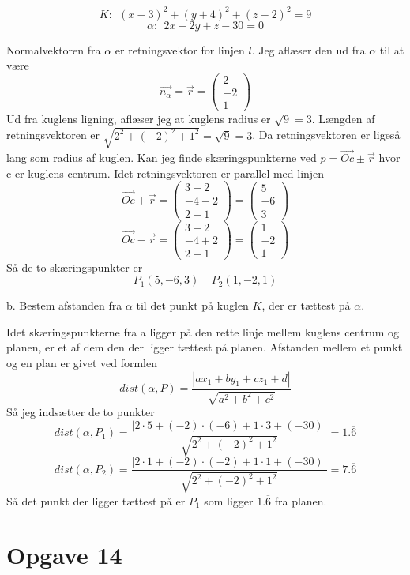 \documentclass[12pt]{article}
\begin{document}
$$K:~~(x-3)^2+(y+4)^2+(z-2)^2=9$$
$$\alpha:~~2x-2y+z-30=0$$

Normalvektoren fra $\alpha$ er retningsvektor for linjen $l$. Jeg aflæser den ud fra $\alpha$ til at være
$$\vec{n_\alpha} = \vec{r} = \begin{pmatrix} 2 \\ -2 \\ 1 \end{pmatrix}$$
Ud fra kuglens ligning, aflæser jeg at kuglens radius er $\sqrt{9} = 3$. Længden af retningsvektoren er $\sqrt{2^2+(-2)^2+1^2} = \sqrt{9} = 3$. Da
retningsvektoren er ligeså lang som radius af kuglen. Kan jeg finde skæringspunkterne ved $p = \vec{Oc} \pm \vec{r}$ hvor c er kuglens centrum.
Idet retningsvektoren er parallel med linjen
$$\vec{Oc} + \vec{r} = \begin{pmatrix} 3+2 \\ -4-2 \\ 2+1 \end{pmatrix} = \begin{pmatrix} 5 \\ -6 \\ 3 \end{pmatrix}$$
$$\vec{Oc} - \vec{r} = \begin{pmatrix} 3-2 \\ -4+2 \\ 2-1 \end{pmatrix} = \begin{pmatrix} 1 \\ -2 \\ 1 \end{pmatrix}$$
Så de to skæringspunkter er
$$P_1(5, -6, 3)~~~~~P_2(1, -2, 1)$$

b. Bestem afstanden fra $\alpha$ til det punkt på kuglen $K$, der er tættest på $\alpha$.

Idet skæringspunkterne fra a ligger på den rette linje mellem kuglens centrum og planen, er et af dem den der ligger tættest på planen.
Afstanden mellem et punkt og en plan er givet ved formlen
$$dist(\alpha, P) = \frac{|ax_1+by_1+cz_1+d|}{\sqrt{a^2+b^2+c^2}}$$
Så jeg indsætter de to punkter
$$dist(\alpha, P_1) = \frac{|2\cdot 5+(-2)\cdot (-6)+1\cdot 3+(-30)|}{\sqrt{2^2+(-2)^2+1^2}} = 1. \overline{6}$$
$$dist(\alpha, P_2) = \frac{|2\cdot 1+(-2)\cdot (-2)+1\cdot 1+(-30)|}{\sqrt{2^2+(-2)^2+1^2}} = 7. \overline{6}$$
Så det punkt der ligger tættest på er $P_1$ som ligger $1. \overline{6}$ fra planen.

\section*{Opgave 14}
\end{document}
